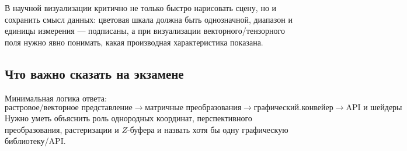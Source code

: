 В научной визуализации критично не только быстро нарисовать сцену, но и
сохранить смысл данных: цветовая шкала должна быть однозначной, диапазон и
единицы измерения --- подписаны, а при визуализации векторного/тензорного поля
нужно явно понимать, какая производная характеристика показана.


\subsection{Что важно сказать на экзамене}

Минимальная логика ответа:
\[
\boxed{
\text{растровое/векторное представление}
\rightarrow
\text{матричные преобразования}
\rightarrow
\text{графический конвейер}
\rightarrow
\text{API и шейдеры}
}.
\]
Нужно уметь объяснить роль однородных координат, перспективного преобразования, растеризации и $Z$-буфера и назвать хотя бы одну графическую библиотеку/API.

\newpage
